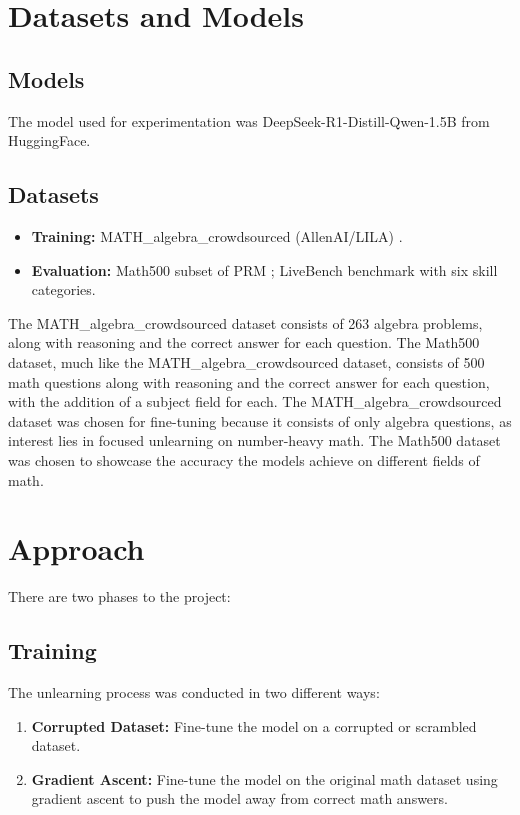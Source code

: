 \documentclass[10pt]{article}
\begin{document}
\section{Datasets and Models}
\subsection{Models}
The model used for experimentation was DeepSeek-R1-Distill-Qwen-1.5B from HuggingFace.
\subsection{Datasets}
\begin{itemize}
  \item \textbf{Training:} MATH\_algebra\_crowdsourced (AllenAI/LILA) \cite{mishra2022lila}.
  \item \textbf{Evaluation:} Math500 subset of PRM \cite{lightman2023lets}; LiveBench benchmark with six skill categories.
\end{itemize}
The MATH\_algebra\_crowdsourced dataset consists of 263 algebra problems, along with reasoning and the correct answer for each question. The Math500 dataset, much like the MATH\_algebra\_crowdsourced dataset, consists of 500 math questions along with reasoning and the correct answer for each question, with the addition of a subject field for each.
The MATH\_algebra\_crowdsourced dataset was chosen for fine-tuning because it consists of only algebra questions, as interest lies in focused unlearning on number-heavy math. The Math500 dataset was chosen to showcase the accuracy the models achieve on different fields of math.

\section{Approach}
There are two phases to the project:

\subsection{Training}
The unlearning process was conducted in two different ways:
\begin{enumerate}
    \item \textbf{Corrupted Dataset:} Fine-tune the model on a corrupted or scrambled dataset.
    \item \textbf{Gradient Ascent:} Fine-tune the model on the original math dataset using gradient ascent to push the model away from correct math answers.
\end{enumerate}
\end{document}

